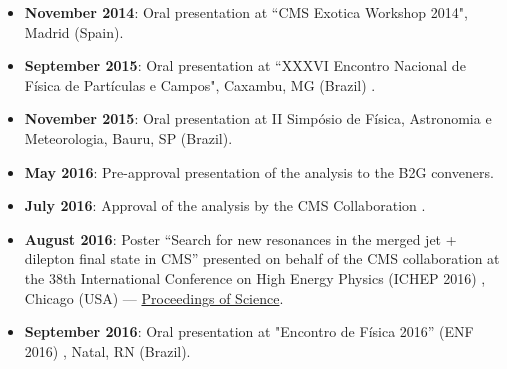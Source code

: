 \begin{itemize}
\item {\bf November 2014}: Oral presentation at ``CMS Exotica Workshop 2014", Madrid (Spain).
\item {\bf September 2015}: Oral presentation at ``XXXVI Encontro Nacional de F\'isica de Part\'iculas e Campos", Caxambu, MG (Brazil) \cite{ENF2015}.
\item {\bf November 2015}: Oral presentation at II Simp\'osio de F\'isica, Astronomia e Meteorologia, Bauru, SP (Brazil).
\item {\bf May 2016}: Pre-approval presentation of the analysis to the B2G conveners.
\item {\bf July 2016}: Approval of the analysis by the CMS Collaboration \cite{CMS-PAS-B2G-16-010}.
\item {\bf August 2016}: Poster ``Search for new resonances in the merged jet + dilepton final state in CMS''
presented on behalf of the CMS collaboration at the 38th International Conference on High Energy Physics (ICHEP 2016) \cite{Proceedings:2016pwg}, Chicago (USA) --- \href{https://pos.sissa.it/archive/conferences/282/757/ICHEP2016_757.pdf}{Proceedings of Science}.
\item {\bf September 2016}: Oral presentation at "Encontro de F\'isica 2016'' (ENF 2016) \cite{ENF2016}, Natal, RN (Brazil).
\end{itemize}  




